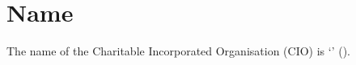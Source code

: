\section{Name}\label{sec:name}
The name of the Charitable Incorporated Organisation (CIO) is `\name{}' (\shortname{}).
